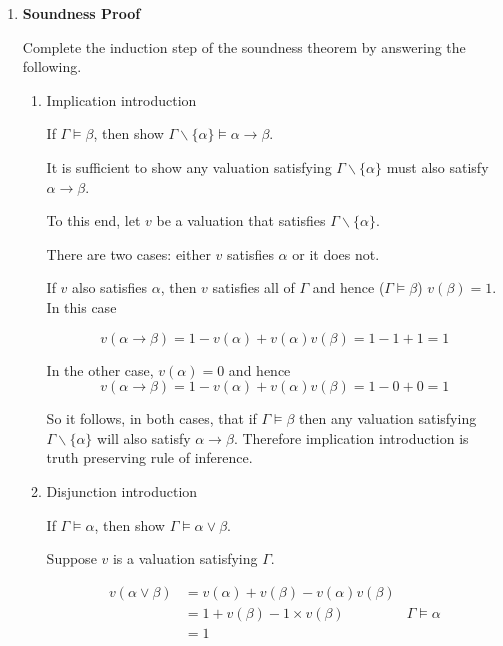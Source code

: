 \documentclass[11pt]{report}
\begin{document}
\begin{enumerate}
\begin{enumerate}
	\end{enumerate}

\newpage
\item {\bf Soundness Proof}	

Complete the induction step of the soundness theorem by answering the following. 

		\begin{enumerate}
			\item Implication introduction
			
			If $\Gamma \models \beta$, then show $\Gamma \backslash\{\alpha\} \models \alpha \rightarrow \beta$.

			\hspace{0.2cm}{\bf Solution}

			It is sufficient to show any valuation satisfying $\Gamma \backslash\{\alpha\}$ must also satisfy $\alpha \rightarrow \beta$. 
			
			To this end, let $v$ be a valuation that satisfies $\Gamma \backslash\{\alpha\}$.

			There are two cases: either $v$ satisfies $\alpha$ or it does not. 

			If $v$ also satisfies $\alpha$, then $v$ satisfies all of $\Gamma$ and hence ($\Gamma \models \beta$) $v(\beta)=1$. In this case 

			$$v(\alpha \to \beta) = 1 - v(\alpha) + v(\alpha)v(\beta) = 1 - 1 + 1 = 1$$

			In the other case, $v(\alpha) = 0$ and hence 
			$$v(\alpha \to \beta) = 1 - v(\alpha) + v(\alpha)v(\beta) = 1 - 0 + 0 = 1$$
			
			So it follows, in both cases, that if $\Gamma \models \beta$ then any valuation satisfying $\Gamma \backslash\{\alpha\}$ will also satisfy $\alpha \to \beta$. Therefore implication introduction is truth preserving rule of inference. 
			
			\vspace{0.2cm}

			\item Disjunction introduction
					
			If $\Gamma \models \alpha$, then show $\Gamma \models \alpha \lor \beta$.

			\hspace{0.2cm}{\bf Solution}

			Suppose $v$ is a valuation satisfying $\Gamma$. 

			\begin{align*}
					v(\alpha \lor \beta) &= v(\alpha) + v(\beta) - v(\alpha)v(\beta) & \\
					&= 1 + v(\beta) - 1 \times v(\beta) & \Gamma \models \alpha\\
					&= 1 & 
			\end{align*}


\end{enumerate}
\end{enumerate}
\end{document}
